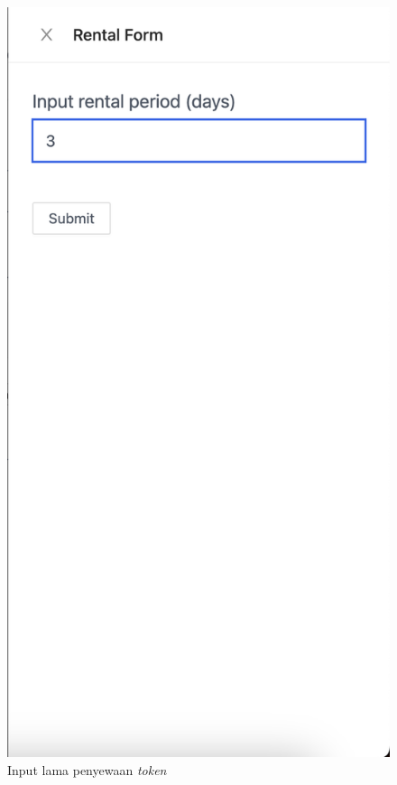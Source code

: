 \begin{itemize}
\begin{figure} [H]
            \includegraphics[scale=0.4]{gambar/img-test-rent-rent-1.png}
            \caption{Input lama penyewaan \emph{token}}
            \label{fig:TestRentInputRentalPeriodToken}
          \end{figure}


\end{itemize}
